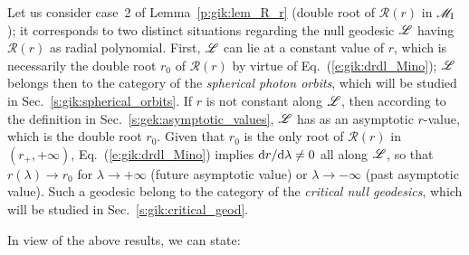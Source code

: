 Let us consider case~2 of Lemma~\ref{p:gik:lem_R_r} (double root of $\mathcal{R}(r)$ in $\mathscr{M}_{\rm I}$);
it corresponds to two distinct situations regarding the null geodesic $\mathscr{L}$ having
$\mathcal{R}(r)$ as radial polynomial. First, $\mathscr{L}$ can lie at a constant value
of $r$, which is necessarily the double root $r_0$ of $\mathcal{R}(r)$
by virtue of Eq.~(\ref{e:gik:drdl_Mino}); $\mathscr{L}$ belongs then to the category
of the \emph{spherical photon orbits}, which will be
studied in Sec.~\ref{s:gik:spherical_orbits}. If $r$ is not constant along $\mathscr{L}$,
then according to the definition in Sec.~\ref{s:gek:asymptotic_values},
$\mathscr{L}$ has as an asymptotic $r$-value, which is the double root $r_0$.
Given that $r_0$ is the only root of $\mathcal{R}(r)$ in $(r_+,+\infty)$,
Eq.~(\ref{e:gik:drdl_Mino}) implies
$\mathrm{d} r/\mathrm{d}\lambda\neq 0$ all along $\mathscr{L}$, so that $r(\lambda)\to r_0$ for
$\lambda\to+\infty$ (future asymptotic value)
or $\lambda\to-\infty$ (past asymptotic value). Such a geodesic belong to the
category of the \emph{critical null geodesics}, which will be studied in
Sec.~\ref{s:gik:critical_geod}.


In view of the above results, we can state:


